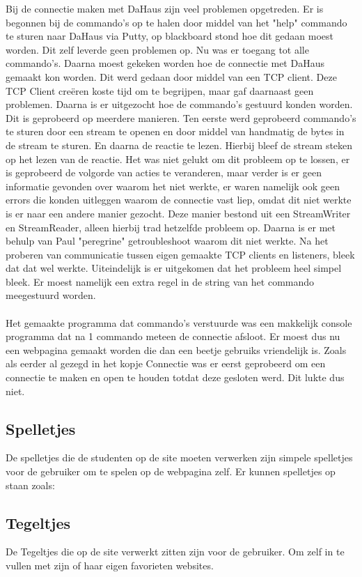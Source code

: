 \documentclass[11pt]{article}
\begin{document}
	Bij de connectie maken met DaHaus zijn veel problemen opgetreden. 
 	Er is begonnen bij de commando's op te halen door middel van het "help" commando te sturen naar DaHaus via Putty, op blackboard stond hoe dit gedaan moest worden. Dit zelf leverde geen problemen op. Nu was er toegang tot alle commando's. Daarna moest gekeken worden hoe de connectie met DaHaus gemaakt kon worden. Dit werd gedaan door middel van een TCP client. Deze TCP Client cre\"{e}ren koste tijd om te begrijpen, maar gaf daarnaast geen problemen. Daarna is er uitgezocht hoe de commando's gestuurd konden worden. Dit is geprobeerd op meerdere manieren. Ten eerste werd geprobeerd commando's te sturen door een stream te openen en door middel van handmatig de bytes in de stream te sturen. En daarna de reactie te lezen. Hierbij bleef de stream steken op het lezen van de reactie. Het was niet gelukt om dit probleem op te lossen, er is geprobeerd de volgorde van acties te veranderen, maar verder is er geen informatie gevonden over waarom het niet werkte, er waren namelijk ook geen errors die konden uitleggen waarom de connectie vast liep, omdat dit niet werkte is er naar een andere manier gezocht. Deze manier bestond uit een StreamWriter en StreamReader, alleen hierbij trad hetzelfde probleem op. Daarna is er met behulp van Paul "peregrine" getroubleshoot waarom dit niet werkte. Na het proberen van communicatie tussen eigen gemaakte TCP clients en listeners, bleek dat dat wel werkte. Uiteindelijk is er uitgekomen dat het probleem heel simpel bleek. Er moest namelijk een extra regel in de string van het commando meegestuurd worden.
 	\\
 	\\
 	Het gemaakte programma dat commando's verstuurde was een makkelijk console programma dat na 1 commando meteen de connectie afsloot. Er moest dus nu een webpagina gemaakt worden die dan een beetje gebruiks vriendelijk is. Zoals als eerder al gezegd in het kopje Connectie was er eerst geprobeerd om een connectie te maken en open te houden totdat deze gesloten werd. Dit lukte dus niet.
 	
 	
	\subsection{Spelletjes}
	De spelletjes die de studenten op de site moeten verwerken zijn simpele spelletjes voor de gebruiker om te spelen op de webpagina zelf. Er kunnen spelletjes op staan zoals: 
	\subsection{Tegeltjes}
	De Tegeltjes die op de site verwerkt zitten zijn voor de gebruiker. Om zelf in te vullen met zijn of haar eigen favorieten websites.
	\newpage
	
\end{document}
